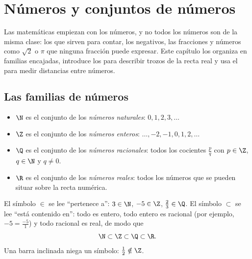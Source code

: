 \chapter{Números y conjuntos de números}\label{ch:g10:numbers}

Las matemáticas empiezan con los números, y no todos los números son de la
misma clase: los que sirven para contar, los negativos, las fracciones y
números como $\sqrt 2$ o $\pi$ que ninguna fracción puede expresar. Este
capítulo los organiza en familias encajadas, introduce los  para
describir trozos de la recta real y usa el  para medir
distancias entre números.

\section{Las familias de números}

\begin{definition}\label{def:g10:numbers:sets}
\begin{itemize}
  \item $\N$ es el conjunto de los \emph{números naturales}:
        $0, 1, 2, 3, \dots$
  \item $\Z$ es el conjunto de los \emph{números enteros}: $\dots, -2, -1,
        0, 1, 2, \dots$
  \item $\Q$ es el conjunto de los \emph{números racionales}:
        todos los cocientes $\frac{p}{q}$ con $p \in \Z$, $q \in \N$ y
        $q \neq 0$.
  \item $\R$ es el conjunto de los \emph{números reales}: todos los
        números que se pueden situar sobre la recta numérica.
\end{itemize}
\end{definition}

\begin{notation}
El símbolo $\in$ se lee ``pertenece a'': $3 \in \N$, $-5 \in \Z$,
$\frac23 \in \Q$. El símbolo $\subset$ se lee ``está contenido en'': todo
 es entero, todo entero es racional
(por ejemplo, $-5 = \frac{-5}{1}$) y todo racional es real, de modo que
\[
\N \subset \Z \subset \Q \subset \R .
\]
Una barra inclinada niega un símbolo: $\frac12 \notin \Z$.
\end{notation}

